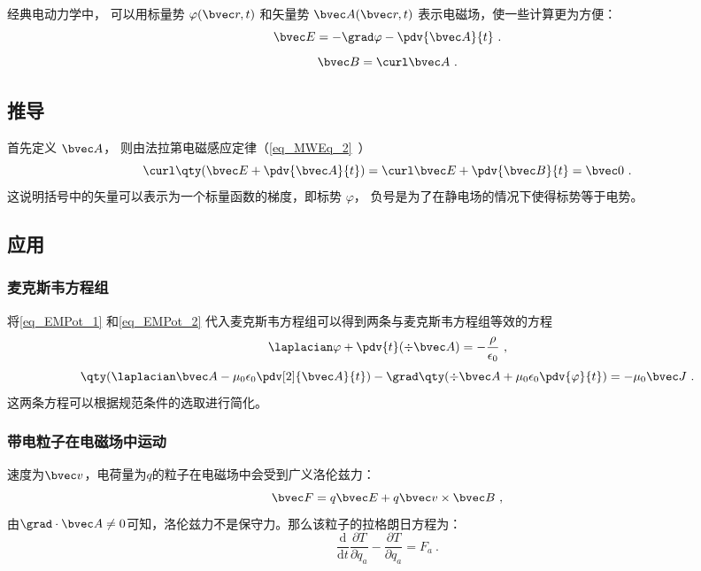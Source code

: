 
\begin{issues}
\issueDraft
\end{issues}


经典电动力学中， 可以用标量势 $\varphi(\bvec r, t)$ 和矢量势 $\bvec A(\bvec r, t)$ 表示电磁场，使一些计算更为方便：
\begin{equation}\label{eq_EMPot_1}
\bvec E = -\grad \varphi - \pdv{\bvec A}{t}~.
\end{equation}
\begin{equation}\label{eq_EMPot_2}
\bvec B = \curl \bvec A~.
\end{equation}

\subsection{推导}
首先定义 $\bvec A$， 则由法拉第电磁感应定律（\autoref{eq_MWEq_2}~）
\begin{equation}
\curl \qty(\bvec E + \pdv{\bvec A}{t}) = \curl \bvec E + \pdv{\bvec B}{t} = \bvec 0~.
\end{equation}
这说明括号中的矢量可以表示为一个标量函数的梯度，即标势 $\varphi$， 负号是为了在静电场的情况下使得标势等于电势。
\subsection{应用}
\subsubsection{麦克斯韦方程组}
将\autoref{eq_EMPot_1} 和\autoref{eq_EMPot_2} 代入麦克斯韦方程组可以得到两条与麦克斯韦方程组等效的方程
\begin{equation}\label{eq_EMPot_4}
\laplacian \varphi + \pdv{t} (\div \bvec A) = -\frac{\rho}{\epsilon_0}~,
\end{equation}
\begin{equation}\label{eq_EMPot_5}
\qty(\laplacian \bvec A - \mu_0\epsilon_0 \pdv[2]{\bvec A}{t}) - \grad \qty(\div \bvec A + \mu_0\epsilon_0 \pdv{\varphi}{t}) = -\mu_0\bvec J~.
\end{equation}
这两条方程可以根据规范条件的选取进行简化。
\subsubsection{带电粒子在电磁场中运动}
速度为$\bvec v$，电荷量为$q$的粒子在电磁场中会受到广义洛伦兹力：
\begin{equation}
\bvec F=q\bvec E+q\bvec v \times \bvec B
~,\end{equation}
由$\grad \cdot \bvec A\neq 0$可知，洛伦兹力不是保守力。那么该粒子的拉格朗日方程为：
\begin{equation}
\frac{\mathrm{d}}{\mathrm{d} t} \frac{\partial T}{\partial \dot{q}_a}-\frac{\partial T}{\partial q_a}=F_a~.
\end{equation}
